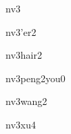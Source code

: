 \begin{multicols}{2}
\begin{hanzi}[女]{nv3}
\end{hanzi}

\begin{hanzi}[女儿]{nv3'er2}
\end{hanzi}

\begin{hanzi}[女孩儿]{nv3hair2}
\end{hanzi}

\begin{hanzi}[女朋友]{nv3peng2you0}
\end{hanzi}

\begin{hanzi}[女王]{nv3wang2}
\end{hanzi}

\begin{hanzi}[女婿]{nv3xu4}
\end{hanzi}

\end{multicols}
